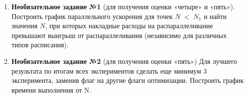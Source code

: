{\begin{enumerate}
так и просто сделать скриншот диспетчера задач, указав на скриншоте моменты начала и окончания эксперимента (в отчёте нужно привести текст скрипта или название использованного диспетчера). Недостаточно привести однократное моментальное измерение загрузки утилитой htop, т.к. требуется привести график изменения загрузки за всё время выполнения программы.
		 отчёт о проделанной работе.
		 к устным вопросам на защите.
		\item\textbf{Необязательное задание №1} (для получения оценки «четыре» и «пять»). Построить график параллельного ускорения для точек $N\;<\;N_1$ и найти значения $N$, при которых накладные расходы на распараллеливание превышают выигрыш от распараллеливания (независимо для различных типов расписания).
		\item\textbf{Необязательное задание №2} (для получения оценки «пять») Для лучшего результата по итогам всех экспериментов сделать еще минимум 3 эксперимента, заменив флаг  на другие флаги оптимизации. Построить график времени выполнения от N.
	\end{enumerate}
}